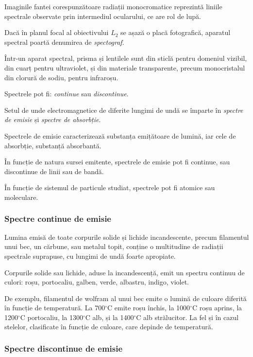 Imaginile fantei corespunzătoare radiații monocromatice reprezintă liniile
spectrale observate prin intermediul ocularului, ce are rol de lupă.

Dacă în planul focal al obiectivului $L_2$ se așază o placă fotografică,
aparatul spectral poartă denumirea de \emph{spectograf}.

Într-un aparat spectral, prisma și lentilele sunt din sticlă pentru domeniul
vizibil, din cuarț pentru ultraviolet, și din materiale transparente, precum
monocristalul din clorură de sodiu, pentru infraroșu.

Spectrele pot fi: \emph{continue} sau \emph{discontinue}.

Setul de unde electromagnetice de diferite lungimi de undă se împarte în
\emph{spectre de emisie} și \emph{spectre de absorbție}.

Spectrele de emisie caracterizează substanța emițătoare de lumină, iar cele de
absorbție, substanță absorbantă.

În funcție de natura sursei emitente, spectrele de emisie pot fi continue, sau discontinue de linii sau de bandă.

În funcție de sistemul de particule studiat, spectrele pot fi atomice sau moleculare.

\subsubsection{Spectre continue de emisie}

Lumina emisă de toate corpurile solide și lichide incandescente, precum
filamentul unui bec, un cărbune, sau metalul topit, conține o multitudine de
radiații spectrale suprapuse, cu lungimi de undă foarte apropiate.

Corpurile solide sau lichide, aduse la incandescență, emit un spectru continuu de culori: roșu, portocaliu, galben, verde, albastru, indigo, violet.

De exemplu, filamentul de wolfram al unui bec emite o lumină de culoare
diferită în funcție de temperatură. La 700$^\circ$C emite roșu închis, la
1000$^\circ$C roșu aprins, la 1200$^\circ$C portocaliu, la 1300$^\circ$C alb,
și la 1400$^\circ$C alb strălucitor. La fel și în cazul stelelor, clasificate
în funcție de culoare, care depinde de temperatură.

\subsubsection{Spectre discontinue de emisie}

